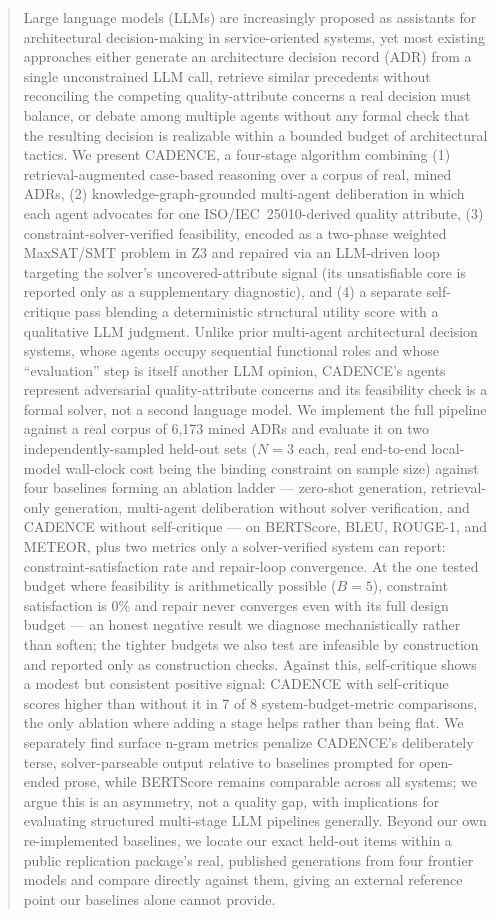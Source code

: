 \documentclass[lettersize,journal]{IEEEtran}
\begin{document}
\begin{abstract}
Large language models (LLMs) are increasingly proposed as assistants for architectural decision-making in service-oriented systems, yet most existing approaches either generate an architecture decision record (ADR) from a single unconstrained LLM call, retrieve similar precedents without reconciling the competing quality-attribute concerns a real decision must balance, or debate among multiple agents without any formal check that the resulting decision is realizable within a bounded budget of architectural tactics. We present CADENCE, a four-stage algorithm combining (1) retrieval-augmented case-based reasoning over a corpus of real, mined ADRs, (2) knowledge-graph-grounded multi-agent deliberation in which each agent advocates for one ISO/IEC~25010-derived quality attribute, (3) constraint-solver-verified feasibility, encoded as a two-phase weighted MaxSAT/SMT problem in Z3 and repaired via an LLM-driven loop targeting the solver's uncovered-attribute signal (its unsatisfiable core is reported only as a supplementary diagnostic), and (4) a separate self-critique pass blending a deterministic structural utility score with a qualitative LLM judgment. Unlike prior multi-agent architectural decision systems, whose agents occupy sequential functional roles and whose ``evaluation'' step is itself another LLM opinion, CADENCE's agents represent adversarial quality-attribute concerns and its feasibility check is a formal solver, not a second language model. We implement the full pipeline against a real corpus of 6{,}173 mined ADRs and evaluate it on two independently-sampled held-out sets ($N=3$ each, real end-to-end local-model wall-clock cost being the binding constraint on sample size) against four baselines forming an ablation ladder --- zero-shot generation, retrieval-only generation, multi-agent deliberation without solver verification, and CADENCE without self-critique --- on BERTScore, BLEU, ROUGE-1, and METEOR, plus two metrics only a solver-verified system can report: constraint-satisfaction rate and repair-loop convergence. At the one tested budget where feasibility is arithmetically possible ($B=5$), constraint satisfaction is 0\% and repair never converges even with its full design budget --- an honest negative result we diagnose mechanistically rather than soften; the tighter budgets we also test are infeasible by construction and reported only as construction checks. Against this, self-critique shows a modest but consistent positive signal: CADENCE with self-critique scores higher than without it in 7 of 8 system-budget-metric comparisons, the only ablation where adding a stage helps rather than being flat. We separately find surface n-gram metrics penalize CADENCE's deliberately terse, solver-parseable output relative to baselines prompted for open-ended prose, while BERTScore remains comparable across all systems; we argue this is an asymmetry, not a quality gap, with implications for evaluating structured multi-stage LLM pipelines generally. Beyond our own re-implemented baselines, we locate our exact held-out items within a public replication package's real, published generations from four frontier models and compare directly against them, giving an external reference point our baselines alone cannot provide.

\end{abstract}
\end{document}
